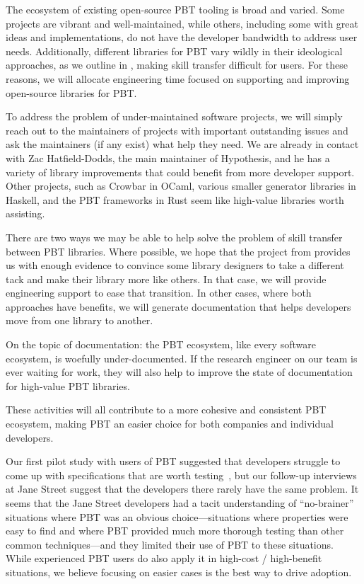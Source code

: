 The ecosystem of existing open-source PBT tooling is broad and varied. Some
projects are vibrant and well-maintained, while others, including some with
great ideas and implementations, do not have the developer bandwidth to address
user needs. Additionally, different libraries for PBT vary wildly in their
ideological approaches, as we outline in , making
skill transfer difficult for users. For these reasons, we will allocate
engineering time focused on supporting and improving open-source libraries for
PBT.

To address the problem of under-maintained software projects, we will simply
reach out to the maintainers of projects with important outstanding issues and
ask the maintainers (if any exist) what help they need. We are already in
contact with Zac Hatfield-Dodds, the main maintainer of Hypothesis, and he has a
variety of library improvements that could benefit from more developer support.
Other projects, such as Crowbar in OCaml, various smaller generator libraries in
Haskell, and the PBT frameworks in Rust seem like high-value libraries worth
assisting.

There are two ways we may be able to help solve the problem of skill transfer
between PBT libraries. Where possible, we hope that the project from
 provides us with enough evidence to convince some
library designers to take a different tack and make their library more like
others. In that case, we will provide engineering support to ease that
transition. In other cases, where both approaches have benefits, we will
generate documentation that helps developers move from one library to another.

On the topic of documentation: the PBT ecosystem, like every software ecosystem,
is woefully under-documented. If the research engineer on our team is ever
waiting for work, they will also help to improve the state of documentation for
high-value PBT libraries.

These activities will all contribute to a more cohesive and consistent PBT
ecosystem, making PBT an easier choice for both companies and individual
developers.

%
Our first pilot study with users of PBT suggested that developers struggle to
come up with specifications that are worth
testing~\cite{goldstein_problems_2022},
but
our follow-up interviews at Jane Street suggest that the developers there
rarely have the same problem. It seems that the Jane Street developers had
a tacit
understanding of ``no-brainer'' situations where PBT was an obvious
choice---situations where properties were easy to find and where PBT provided
much more thorough testing than other common techniques---and they limited their
use of PBT to these situations.
While experienced PBT users do also apply it in
high-cost / high-benefit situations, we believe
focusing on easier cases is the best way to drive adoption.

